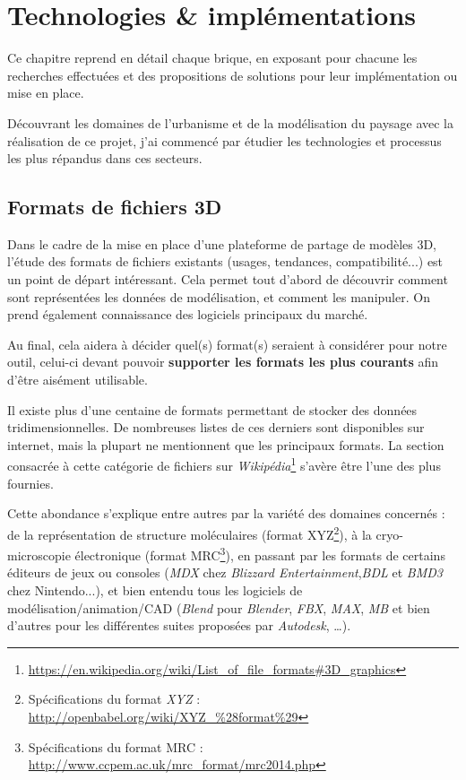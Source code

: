 \chapter{Technologies \& implémentations}
\label{Chapter3}

Ce chapitre reprend en détail chaque brique, en exposant pour chacune les recherches effectuées et des propositions de solutions pour leur implémentation ou mise en place.

Découvrant les domaines de l'urbanisme et de la modélisation du paysage avec la réalisation de ce projet, j'ai commencé par étudier les technologies et processus les plus répandus dans ces secteurs.

\section{Formats de fichiers 3D}

Dans le cadre de la mise en place d'une plateforme de partage de modèles 3D, l'étude des formats de fichiers existants (usages, tendances, compatibilité...) est un point de départ intéressant. Cela permet tout d'abord de découvrir comment sont représentées les données de modélisation, et comment les manipuler. On prend également connaissance des logiciels principaux du marché.

Au final, cela aidera à décider quel(s) format(s) seraient à considérer pour notre outil, celui-ci devant pouvoir \textbf{supporter les formats les plus courants} afin d'être aisément utilisable.

Il existe plus d'une centaine de formats permettant de stocker des données tridimensionnelles. De nombreuses listes de ces derniers sont disponibles sur internet, mais la plupart ne mentionnent que les principaux formats. La section consacrée à cette catégorie de fichiers sur \textit{Wikipédia}\footnote{\url{https://en.wikipedia.org/wiki/List_of_file_formats\#3D_graphics}} s'avère être l'une des plus fournies. 


Cette abondance s'explique entre autres par la variété des domaines concernés : de la représentation de structure moléculaires (format XYZ\footnote{Spécifications du format \textit{XYZ} : \url{http://openbabel.org/wiki/XYZ_\%28format\%29}}), à la cryo-microscopie électronique (format MRC\footnote{Spécifications du format MRC : \url{http://www.ccpem.ac.uk/mrc_format/mrc2014.php}}), en passant par les formats de certains éditeurs de jeux ou consoles (\textit{MDX} chez \textit{Blizzard Entertainment},\textit{BDL} et \textit{BMD3} chez Nintendo...), et bien entendu tous les logiciels de modélisation/animation/CAD (\textit{Blend} pour \textit{Blender}, \textit{FBX}, \textit{MAX}, \textit{MB} et bien d'autres pour les différentes suites proposées par \textit{Autodesk}, \ldots).

